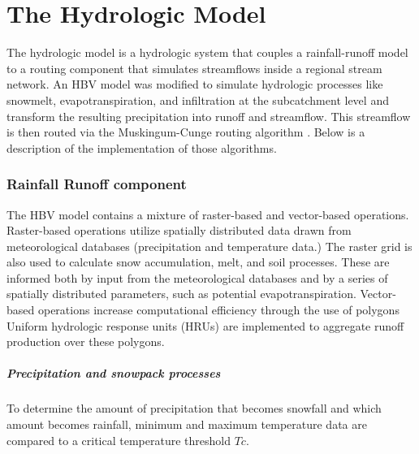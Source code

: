 
\chapter{The Hydrologic Model}
\label{chap:daWUAPhydroengine}

The hydrologic model is a hydrologic system that couples a rainfall-runoff model to a routing component that simulates streamflows inside a regional stream network. An HBV model \cite{Bergstrom1995, Bergstrom1973} was modified to simulate hydrologic processes like snowmelt, evapotranspiration, and infiltration at the subcatchment level and transform the resulting precipitation into runoff and streamflow. This streamflow is then routed via the Muskingum-Cunge routing algorithm \cite{Chow1988}. Below is a description of the implementation of those algorithms.

\subsection{Rainfall Runoff component}

The HBV model \cite{Bergstrom1995, Bergstrom1973} contains a mixture of raster-based and vector-based operations. Raster-based operations utilize spatially distributed data drawn from meteorological databases (precipitation and temperature data.)  The raster grid is also used to calculate snow accumulation, melt, and soil processes. These are informed both by input from the meteorological databases and by a series of spatially distributed parameters, such as potential evapotranspiration. Vector-based operations increase computational efficiency through the use of polygons Uniform hydrologic response units (HRUs) are implemented to aggregate runoff production over these polygons.

\paragraph{Precipitation and snowpack processes}     

To determine the amount of precipitation that becomes snowfall and which amount becomes rainfall, minimum and maximum temperature data are compared to a critical temperature threshold $Tc$.


